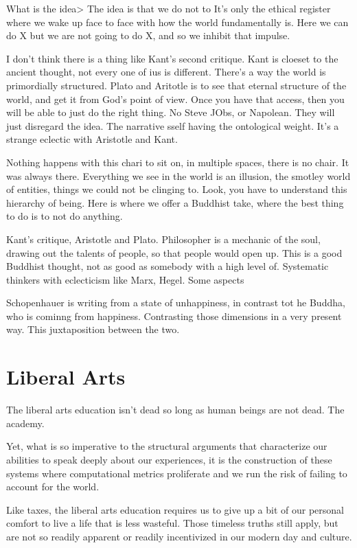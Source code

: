 \documentclass[12pt,letterpaper]{article}
\begin{document}
What is the idea> The idea is that we do not to  It's only the ethical register where we wake up face to face with how the world fundamentally is.  Here we can do X but we are not going to do X, and so we inhibit that impulse.

I don't think there is a thing like Kant's second critique.  Kant is cloeset to the ancient thought, not every one of ius is different.  There's a way the world is primordially structured.  Plato and Aritotle is to see that eternal structure of the world, and get it from God's point of view.  Once you have that access, then you will be able to just do the right thing.  No Steve JObs, or Napolean.  They will just disregard the idea.  The narrative sself having the ontological weight.  It's a strange eclectic with Aristotle and Kant.

Nothing happens with this chari to sit on, in multiple spaces, there is no chair.  It was always there.  Everything we see in the world is an illusion, the smotley world of entities, things we could not be clinging to.  Look, you have to understand this hierarchy of being.  Here is where we offer a Buddhist take, where the best thing to do is to not do anything.

Kant's critique, Aristotle and Plato.  Philosopher is a mechanic of the soul, drawing out the talents of people, so that people would open up.  This is a good Buddhist thought, not as good as somebody with a high level of.  Systematic thinkers with eclecticism like Marx, Hegel.  Some aspects 

Schopenhauer is writing from a state of unhappiness, in contrast tot he Buddha, who is cominng from happiness.  Contrasting those dimensions in a very present way.  This juxtaposition between the two.  

\section{Liberal Arts}
The liberal arts education isn't dead so long as human beings are not dead.  The academy. 

Yet, what is so imperative to the structural arguments that characterize our abilities to speak deeply about our experiences, it is the construction of these systems where computational metrics proliferate and we run the risk of failing to account for the world.

Like taxes, the liberal arts education requires us to give up a bit of our personal comfort to live a life that is less wasteful.  Those timeless truths still apply, but are not so readily apparent or readily incentivized in our modern day and culture.



\end{document}

